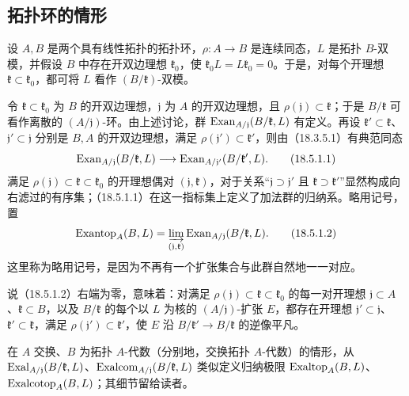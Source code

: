 \subsection{拓扑环的情形}
设 $A,B$ 是两个具有线性拓扑的拓扑环，$\rho:A\to B$ 是连续同态，$L$ 是拓扑 $B$-双模，并假设 $B$ 中存在开双边理想 $\mathfrak k_0$，使 $\mathfrak k_0L=L\mathfrak k_0=0$。于是，对每个开理想 $\mathfrak k\subset\mathfrak k_0$，都可将 $L$ 看作 $(B/\mathfrak k)$-双模。

令 $\mathfrak k\subset\mathfrak k_0$ 为 $B$ 的开双边理想，$\mathfrak j$ 为 $A$ 的开双边理想，且 $\rho(\mathfrak j)\subset\mathfrak k$；于是 $B/\mathfrak k$ 可看作离散的 $(A/\mathfrak j)$-环。由上述讨论，群 $\operatorname{Exan}_{A/\mathfrak j}(B/\mathfrak k,L)$ 有定义。再设 $\mathfrak k'\subset\mathfrak k$、$\mathfrak j'\subset\mathfrak j$ 分别是 $B,A$ 的开双边理想，满足 $\rho(\mathfrak j')\subset\mathfrak k'$，则由（18.3.5.1）有典范同态
\begin{equation}
 \operatorname{Exan}_{A/\mathfrak j}(B/\mathfrak k,L)
 \longrightarrow\operatorname{Exan}_{A/\mathfrak j'}(B/\mathfrak k',L).
 \tag{18.5.1.1}
\end{equation}
满足 $\rho(\mathfrak j)\subset\mathfrak k\subset\mathfrak k_0$ 的开理想偶对 $(\mathfrak j,\mathfrak k)$，对于关系“$\mathfrak j\supset\mathfrak j'$ 且 $\mathfrak k\supset\mathfrak k'$”显然构成向右滤过的有序集；（18.5.1.1）在这一指标集上定义了加法群的归纳系。略用记号，置
\begin{equation}
 \operatorname{Exantop}_A(B,L)=
 \varinjlim_{(\mathfrak j,\mathfrak k)}
 \operatorname{Exan}_{A/\mathfrak j}(B/\mathfrak k,L).
 \tag{18.5.1.2}
\end{equation}
这里称为略用记号，是因为不再有一个扩张集合与此群自然地一一对应。

说（18.5.1.2）右端为零，意味着：对满足 $\rho(\mathfrak j)\subset\mathfrak k\subset\mathfrak k_0$ 的每一对开理想 $\mathfrak j\subset A$、$\mathfrak k\subset B$，以及 $B/\mathfrak k$ 的每个以 $L$ 为核的 $(A/\mathfrak j)$-扩张 $E$，都存在开理想 $\mathfrak j'\subset\mathfrak j$、$\mathfrak k'\subset\mathfrak k$，满足 $\rho(\mathfrak j')\subset\mathfrak k'$，使 $E$ 沿 $B/\mathfrak k'\to B/\mathfrak k$ 的逆像平凡。

在 $A$ 交换、$B$ 为拓扑 $A$-代数（分别地，交换拓扑 $A$-代数）的情形，从 $\operatorname{Exal}_{A/\mathfrak j}(B/\mathfrak k,L)$、$\operatorname{Exalcom}_{A/\mathfrak j}(B/\mathfrak k,L)$ 类似定义归纳极限 $\operatorname{Exaltop}_A(B,L)$、$\operatorname{Exalcotop}_A(B,L)$；其细节留给读者。


